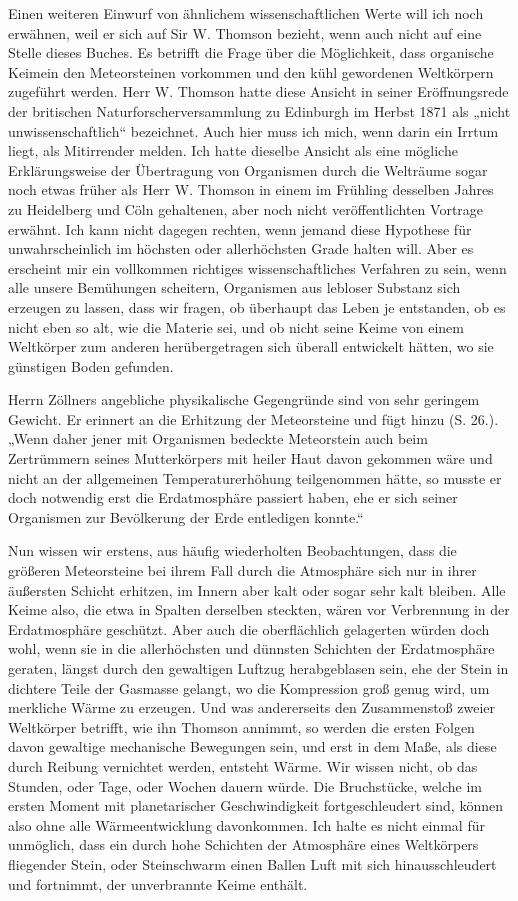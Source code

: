 \documentclass[a4paper, 11pt, oneside, german]{article}
\begin{document}
Einen weiteren Einwurf von ähnlichem wissenschaftlichen Werte will ich noch erwähnen, weil er sich auf Sir W. Thomson bezieht, wenn auch nicht auf eine Stelle dieses Buches. Es betrifft die Frage über die Möglichkeit, dass organische Keimein den Meteorsteinen vorkommen und den kühl gewordenen Weltkörpern zugeführt werden. Herr W. Thomson hatte diese Ansicht in seiner Eröffnungsrede der britischen Naturforscherversammlung zu Edinburgh im Herbst 1871 als „nicht unwissenschaftlich“ bezeichnet. Auch hier muss ich mich, wenn darin ein Irrtum liegt, als Mitirrender melden. Ich hatte dieselbe Ansicht als eine mögliche Erklärungsweise der Übertragung von Organismen durch die Welträume sogar noch etwas früher als Herr W. Thomson in einem im Frühling desselben Jahres zu Heidelberg und Cöln gehaltenen, aber noch nicht veröffentlichten Vortrage erwähnt. Ich kann nicht dagegen rechten, wenn jemand diese Hypothese für unwahrscheinlich im höchsten oder allerhöchsten Grade halten will. Aber es erscheint mir ein vollkommen richtiges wissenschaftliches Verfahren zu sein, wenn alle unsere Bemühungen scheitern, Organismen aus lebloser Substanz sich erzeugen zu lassen, dass wir fragen, ob überhaupt das Leben je entstanden, ob es nicht eben so alt, wie die Materie sei, und ob nicht seine Keime von einem Weltkörper zum anderen herübergetragen sich überall entwickelt hätten, wo sie günstigen Boden gefunden.

Herrn Zöllners angebliche physikalische Gegengründe sind von sehr geringem Gewicht. Er erinnert an die Erhitzung der Meteorsteine und fügt hinzu (S. 26.). „Wenn daher jener mit Organismen bedeckte Meteorstein auch beim Zertrümmern seines Mutterkörpers mit heiler Haut davon gekommen wäre und nicht an der allgemeinen Temperaturerhöhung teilgenommen hätte, so musste er doch notwendig erst die Erdatmosphäre passiert haben, ehe er sich seiner Organismen zur Bevölkerung der Erde entledigen konnte.“

Nun wissen wir erstens, aus häufig wiederholten Beobachtungen, dass die größeren Meteorsteine bei ihrem Fall durch die Atmosphäre sich nur in ihrer äußersten Schicht erhitzen, im Innern aber kalt oder sogar sehr kalt bleiben. Alle Keime also, die etwa in Spalten derselben steckten, wären vor Verbrennung in der Erdatmosphäre geschützt. Aber auch die oberflächlich gelagerten würden doch wohl, wenn sie in die allerhöchsten und dünnsten Schichten der Erdatmosphäre geraten, längst durch den gewaltigen Luftzug herabgeblasen sein, ehe der Stein in dichtere Teile der Gasmasse gelangt, wo die Kompression groß genug wird, um merkliche Wärme zu erzeugen. Und was andererseits den Zusammenstoß zweier Weltkörper betrifft, wie ihn Thomson annimmt, so werden die ersten Folgen davon gewaltige mechanische Bewegungen sein, und erst in dem Maße, als diese durch Reibung vernichtet werden, entsteht Wärme. Wir wissen nicht, ob das Stunden, oder Tage, oder Wochen dauern würde. Die Bruchstücke, welche im ersten Moment mit planetarischer Geschwindigkeit fortgeschleudert sind, können also ohne alle Wärmeentwicklung davonkommen. Ich halte es nicht einmal für unmöglich, dass ein durch hohe Schichten der Atmosphäre eines Weltkörpers fliegender Stein, oder Steinschwarm einen Ballen Luft mit sich hinausschleudert und fortnimmt, der unverbrannte Keime enthält.
\end{document}
